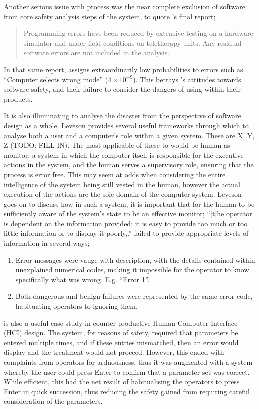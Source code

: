 \documentclass{cshonours}
\begin{document}
Another serious issue with process was the near complete exclusion of software from core safety analysis steps of the \ther system, to quote \aecl's final report; 
\begin{quote}
Programming errors have been reduced by extensive testing on a hardware simulator and under field conditions on teletherapy units. Any residual software errors are not included in the analysis. \cite[p.~4]{leveson1993investigation}
\end{quote}
In that same report, \aecl assigns extraordinarily low probabilities to errors such as ``Computer selects wrong mode'' ($4 \times 10^{-9}$). This betrays \aecl's attitudes towards software safety, and their failure to consider the dangers of using \soup within their products. 

It is also illuminating to analyse the \ther disaster from the perspective of software design as a whole. Leveson \cite{safeware} provides several useful frameworks through which to analyse both a user and a computer's role within a given system. These are X, Y, Z (TODO: FILL IN). The most applicable of these to \ther would be human as monitor; a system in which the computer itself is responsible for the executive actions in the system, and the human serves a supervisory role, ensuring that the process is error free. This may seem at odds when considering the entire intelligence of the system being still vested in the human, however the actual execution of the actions are the sole domain of the computer system. Leveson goes on to discuss how in such a system, it is important that for the human to be sufficiently aware of the system's state to be an effective monitor; ``[t]he operator is dependent on the information provided; it is easy to provide too much or too little information or to display it poorly,.'' \cite[p.~TODO]{safeware} \ther failed to provide appropriate levels of information in several ways;
\begin{enumerate}
  \item Error messages were vauge with description, with the details contained within unexplained numerical codes, making it impossible for the operator to know specifically what was wrong. E.g. ``Error 1''.
  \item Both dangerous and benign failures were represented by the same error code, habituating operators to ignoring them.
\end{enumerate}

\ther is also a useful case study in counter-productive Human-Computer Interface (HCI) design. The system, for reasons of safety, required that parameters be entered multiple times, and if these entries mismatched, then an error would display and the treatment would not proceed. However, this ended with complaints from operators for arduousness, thus it was augmented with a system whereby the user could press Enter to confirm that a parameter set was correct. While efficient, this had the net result of habitualising the operators to press Enter in quick succession, thus reducing the safety gained from requiring careful consideration of the parameters. \cite[p.~274]{saferworld}
\end{document}
